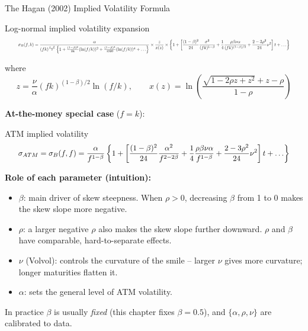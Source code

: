 \documentclass[aspectratio=169,10pt]{beamer}
\begin{document}
\begin{frame}[allowframebreaks]{The Hagan (2002) Implied Volatility Formula}
  \begin{block}{Log-normal implied volatility expansion}
  \begin{equation}
    \resizebox{0.95\linewidth}{!}{$\displaystyle
    \sigma_B(f,k) = \frac{\alpha}{(fk)^{\frac{1-\beta}{2}}\left\{1+\frac{(1-\beta)^2}{24}(\ln(f/k))^2 + \frac{(1-\beta)^4}{1920}(\ln(f/k))^4+\ldots\right\}} \times \frac{z}{x(z)} \times \left\{1 + \left[\frac{(1-\beta)^2}{24}\frac{\sigma^2}{(fk)^{1-\beta}} + \frac14\frac{\rho\beta\nu\alpha}{(fk)^{(1-\beta)/2}} + \frac{2-3\rho^2}{24}\nu^2\right]t + \ldots\right\}
    $}
  \end{equation}
  \end{block}
  where
  \begin{equation}
    z = \frac{\nu}{\alpha}(fk)^{(1-\beta)/2}\ln(f/k), \qquad
    x(z) = \ln\!\left(\frac{\sqrt{1-2\rho z + z^2}+z-\rho}{1-\rho}\right)
  \end{equation}

  \framebreak

  \textbf{At-the-money special case} ($f=k$):
  \begin{block}{ATM implied volatility}
  \begin{equation}
    \resizebox{0.95\linewidth}{!}{$\displaystyle
    \sigma_{ATM} = \sigma_B(f,f) = \frac{\alpha}{f^{1-\beta}}\left\{1 + \left[\frac{(1-\beta)^2}{24}\frac{\alpha^2}{f^{2-2\beta}} + \frac14 \frac{\rho\beta\nu\alpha}{f^{1-\beta}} + \frac{2-3\rho^2}{24}\nu^2\right]t+\ldots\right\}
    $}
  \end{equation}
  \end{block}

  \textbf{Role of each parameter (intuition):}
  \begin{itemize}
    \item $\beta$: main driver of skew steepness. When $\rho>0$, decreasing $\beta$ from 1 to 0 makes the skew slope more negative.
    \item $\rho$: a larger negative $\rho$ also makes the skew slope further downward. $\rho$ and $\beta$ have comparable, hard-to-separate effects.
    \item $\nu$ (Volvol): controls the curvature of the smile -- larger $\nu$ gives more curvature; longer maturities flatten it.
    \item $\alpha$: sets the general level of ATM volatility.
  \end{itemize}
  In practice $\beta$ is usually \emph{fixed} (this chapter fixes $\beta=0.5$), and $\{\alpha,\rho,\nu\}$ are calibrated to data.
\end{frame}
\end{document}
